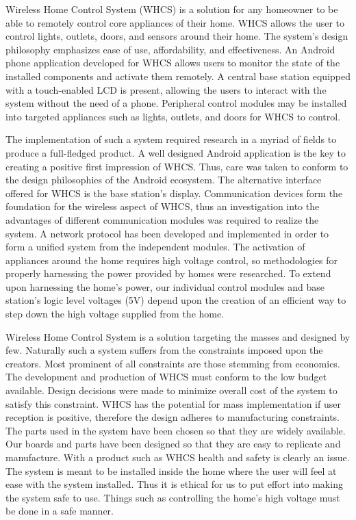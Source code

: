 Wireless Home Control System (WHCS) is a solution for any homeowner to
be able to remotely control core appliances of their home. WHCS
allows the user to control lights, outlets, doors, and sensors around their
home. The system{}'s design philosophy emphasizes ease of use, affordability,
and effectiveness. An Android phone application developed for WHCS allows
users to monitor the state of the installed components and activate them
remotely. A central base station equipped with a touch{}-enabled LCD is
present, allowing the users to interact with the system without the need of a
phone. Peripheral control modules may be installed into targeted
appliances such as lights, outlets, and doors for WHCS to control.

The implementation of such a system required research in a myriad of fields to
produce a full{}-fledged product. A well designed Android application is the key to
creating a positive first impression of WHCS. Thus, care was taken to
conform to the design philosophies of the Android ecosystem. The alternative
interface offered for WHCS is the base station{}'s display. Communication
devices form the foundation for the wireless aspect of WHCS, thus an
investigation into the advantages of different communication modules was
required to realize the system. A network protocol has been developed
and implemented in order to form a unified system from the independent modules.
The activation of appliances around the home requires high voltage control, so
methodologies for properly harnessing the power provided by homes were researched.
To extend upon harnessing the home{}'s power, our individual
control modules and base station{}'s logic level voltages (5V) depend upon the
creation of an efficient way to step down the high voltage supplied from the
home.

Wireless Home Control System is a solution targeting the masses and designed by
few. Naturally such a system suffers from the constraints imposed upon the
creators. Most prominent of all constraints are those stemming from economics.
The development and production of WHCS must conform to the low budget
available. Design decisions were made to minimize overall cost of the system
to satisfy this constraint. WHCS has the potential for mass implementation if
user reception is positive, therefore the design adheres to manufacturing
constraints. The parts used in the system have been chosen so that they are
widely available. Our boards and parts have been designed so that they are easy
to replicate and manufacture. With a product such as WHCS health and safety is
clearly an issue. The system is meant to be installed inside the home where the
user will feel at ease with the system installed. Thus it is ethical for us to
put effort into making the system safe to use. Things such as controlling the
home{}'s high voltage must be done in a safe manner.
